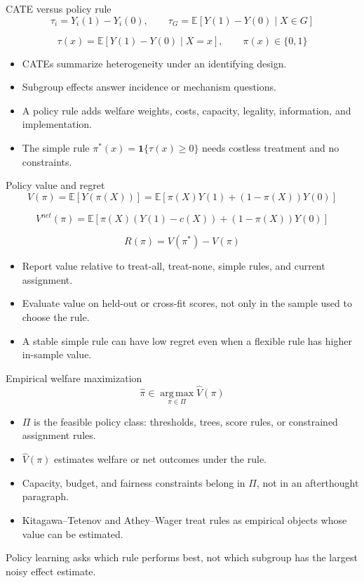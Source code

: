 \documentclass[aspectratio=169,11pt]{beamer}
\newcommand{\E}{\mathbb{E}}
\newcommand{\1}{\mathbf{1}}
\newcommand{\argmax}{\operatorname*{arg\,max}}
\begin{document}
\begin{frame}{CATE versus policy rule}
\small
\[
\tau_i=Y_i(1)-Y_i(0),
\qquad
\tau_G=\E[Y(1)-Y(0)\mid X\in G]
\]

\[
\tau(x)=\E[Y(1)-Y(0)\mid X=x],
\qquad
\pi(x)\in\{0,1\}
\]

\begin{itemize}
    \item CATEs summarize heterogeneity under an identifying design.
    \item Subgroup effects answer incidence or mechanism questions.
    \item A policy rule adds welfare weights, costs, capacity, legality, information, and implementation.
    \item The simple rule \(\pi^*(x)=\1\{\tau(x)\geq 0\}\) needs costless treatment and no constraints.
\end{itemize}
\end{frame}

\begin{frame}{Policy value and regret}
\small
\[
V(\pi)=\E[Y(\pi(X))]
=
\E\left[\pi(X)Y(1)+\left(1-\pi(X)\right)Y(0)\right]
\]

\[
V^{net}(\pi)
=
\E\left[\pi(X)(Y(1)-c(X))+\left(1-\pi(X)\right)Y(0)\right]
\]

\[
R(\pi)=V(\pi^*)-V(\pi)
\]

\begin{itemize}
    \item Report value relative to treat-all, treat-none, simple rules, and current assignment.
    \item Evaluate value on held-out or cross-fit scores, not only in the sample used to choose the rule.
    \item A stable simple rule can have low regret even when a flexible rule has higher in-sample value.
\end{itemize}
\end{frame}

\begin{frame}{Empirical welfare maximization}
\small
\[
\widehat\pi \in \argmax_{\pi\in\Pi}\widehat V(\pi)
\]

\begin{itemize}
    \item \(\Pi\) is the feasible policy class: thresholds, trees, score rules, or constrained assignment rules.
    \item \(\widehat V(\pi)\) estimates welfare or net outcomes under the rule.
    \item Capacity, budget, and fairness constraints belong in \(\Pi\), not in an afterthought paragraph.
    \item Kitagawa--Tetenov and Athey--Wager treat rules as empirical objects whose value can be estimated.
\end{itemize}

\medskip
Policy learning asks which rule performs best, not which subgroup has the largest noisy effect estimate.
\end{frame}
\end{document}

